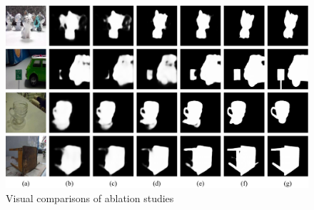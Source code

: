 \begin{figure}[t] 
	\includegraphics[width=0.99\linewidth]{figures/chapter3/self-comparsion-Use} 
	\centering
	{Visual comparisons of ablation studies}
	\label{figure:self_comp}
\end{figure}




